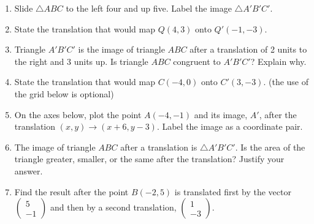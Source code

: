 \documentclass[12pt, twoside]{article}
\begin{document}
\begin{enumerate}
\newpage
\item Slide $\triangle ABC$ to the left four and up five. Label the image $\triangle A'B'C'$.
  \begin{center}
  \end{center}
 
\item State the translation that would map $Q(4,3)$ onto $Q'(-1,-3)$. \vspace{2cm}

\item Triangle $A'B'C'$ is the image of triangle $ABC$ after a translation of 2 units to the right and 3 units up. Is triangle $ABC$ congruent to $A'B'C'$? Explain why. \vspace{3cm}
 
\item State the translation that would map $C(-4,0)$ onto $C'(3,-3)$. (the use of the grid below is optional)
\begin{center}
\end{center}

\newpage
\item On the axes below, plot the point $A(-4,-1)$ and its image, $A'$, after the translation $(x,y) \rightarrow (x+6,y-3)$. Label the image as a coordinate pair.
    \begin{center}
  \end{center}

  \item The image of triangle $ABC$ after a translation is $\triangle A'B'C'$. Is the area of the triangle greater, smaller, or the same after the translation? Justify your answer. \vspace{3cm}

\item Find the result after the point $B(-2,5)$ is translated first by the vector $\left(
  \begin{array}{c}
    5\\
    -1
  \end{array} \right)$
  and then by a second translation,
  $\left( \begin{array}{c}
    1\\
    -3
  \end{array} \right)$.

\end{enumerate}
\end{document}
